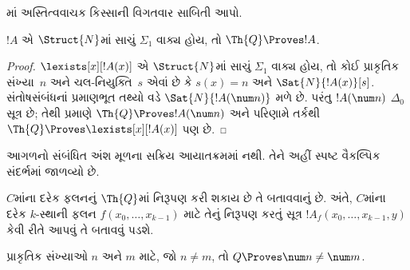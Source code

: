 \begin{prob}
માં
અસ્તિત્વવાચક કિસ્સાની વિગતવાર
સાબિતી આપો.
\end{prob}

\begin{thm}
$!A$ એ $\Struct{N}$માં સાચું
$\Sigma_1$ વાક્ય હોય,
તો $\Th{Q} \Proves !A$.
\end{thm}

\begin{proof}
$\lexists[x][!A(x)]$ એ
$\Struct{N}$માં સાચું
$\Sigma_1$ વાક્ય
હોય, તો કોઈ પ્રાકૃતિક
સંખ્યા~$n$ અને ચલ-નિયુક્તિ~$s$
એવાં છે કે $s(x) = n$ અને
$\Sat{N}{!A(x)}[s]$.
સંતોષસંબંધનાં પ્રમાણભૂત
તથ્યો વડે $\Sat{N}{!A(\num n)}$
મળે છે. પરંતુ $!A(\num n)$
$\Delta_0$ સૂત્ર છે;
તેથી 
પ્રમાણે $\Th{Q} \Proves
!A(\num n)$ અને પરિણામે
તર્કથી $\Th{Q} \Proves
\lexists[x][!A(x)]$ પણ છે.
\end{proof}
\endgroup


\OLEndChapterHook


\begin{editorial}
આગળનો સંબંધિત અંશ મૂળના સક્રિય આયાતક્રમમાં નથી. તેને અહીં સ્પષ્ટ વૈકલ્પિક સંદર્ભમાં જાળવ્યો છે.
\end{editorial}
\begingroup
\makeatletter{}\makeatother

\label{guunit:OLP-0647}


$C$માંના દરેક ફલનનું
$\Th{Q}$માં નિરૂપણ
કરી શકાય છે તે
બતાવવાનું છે. અંતે,
$C$માંના દરેક $k$-સ્થાની
ફલન $f(x_0,\dots,x_{k-1})$
માટે તેનું નિરૂપણ
કરતું સૂત્ર
$!A_f(x_0,\dots,x_{k-1},y)$
કેવી રીતે આપવું
તે બતાવવું પડશે.

\begin{lem}
પ્રાકૃતિક સંખ્યાઓ $n$
અને $m$ માટે, જો
$n \neq m$, તો
$Q \Proves \num
n \neq \num m$.
\end{lem}

